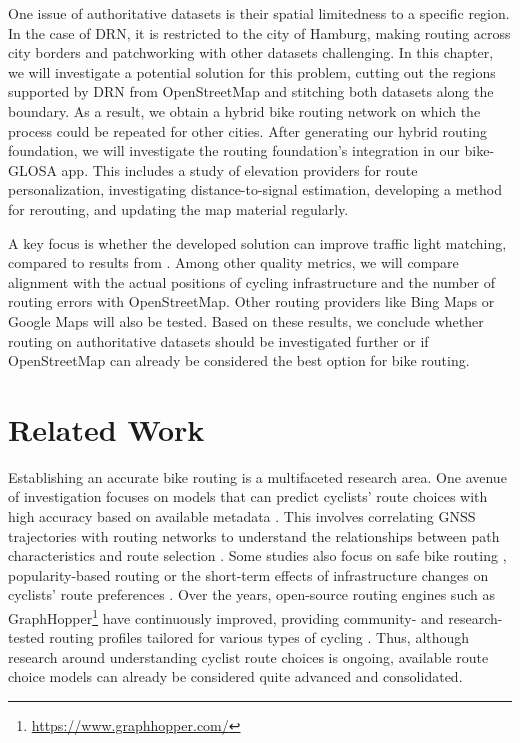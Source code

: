 One issue of authoritative datasets is their spatial limitedness to a specific region. In the case of DRN, it is restricted to the city of Hamburg, making routing across city borders and patchworking with other datasets challenging. In this chapter, we will investigate a potential solution for this problem, cutting out the regions supported by DRN from OpenStreetMap and stitching both datasets along the boundary. As a result, we obtain a hybrid bike routing network on which the process could be repeated for other cities. After generating our hybrid routing foundation, we will investigate the routing foundation's integration in our bike-GLOSA app. This includes a study of elevation providers for route personalization, investigating distance-to-signal estimation, developing a method for rerouting, and updating the map material regularly.

A key focus is whether the developed solution can improve traffic light matching, compared to results from . Among other quality metrics, we will compare alignment with the actual positions of cycling infrastructure and the number of routing errors with OpenStreetMap. Other routing providers like Bing Maps or Google Maps will also be tested. Based on these results, we conclude whether routing on authoritative datasets should be investigated further or if OpenStreetMap can already be considered the best option for bike routing.

\section{Related Work}

Establishing an accurate bike routing is a multifaceted research area. One avenue of investigation focuses on models that can predict cyclists' route choices with high accuracy based on available metadata \cite{dill_understanding_2008, ghanayim_modelling_2018, huber_modelling_2021}. This involves correlating GNSS trajectories with routing networks to understand the relationships between path characteristics and route selection \cite{sultan_extracting_2017, huber_modelling_2021}. Some studies also focus on safe bike routing \cite{loidl_online_2018}, popularity-based routing \cite{bergman_conflation_2016} or the short-term effects of infrastructure changes on cyclists' route preferences \cite{yeboah_route_2015, pritchard_does_2019}. Over the years, open-source routing engines such as GraphHopper\footnote{\url{https://www.graphhopper.com/}} have continuously improved, providing community- and research-tested routing profiles tailored for various types of cycling \cite{krismer_elevation_2016}. Thus, although research around understanding cyclist route choices is ongoing, available route choice models can already be considered quite advanced and consolidated.

